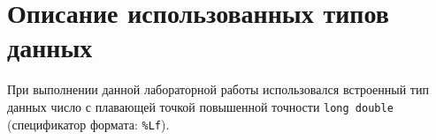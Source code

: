 \section{Описание использованных типов данных}

При выполнении данной лабораторной работы использовался
встроенный тип данных число с плавающей точкой повышенной точности
\texttt{long double} (спецификатор формата: \texttt{\%Lf}).
